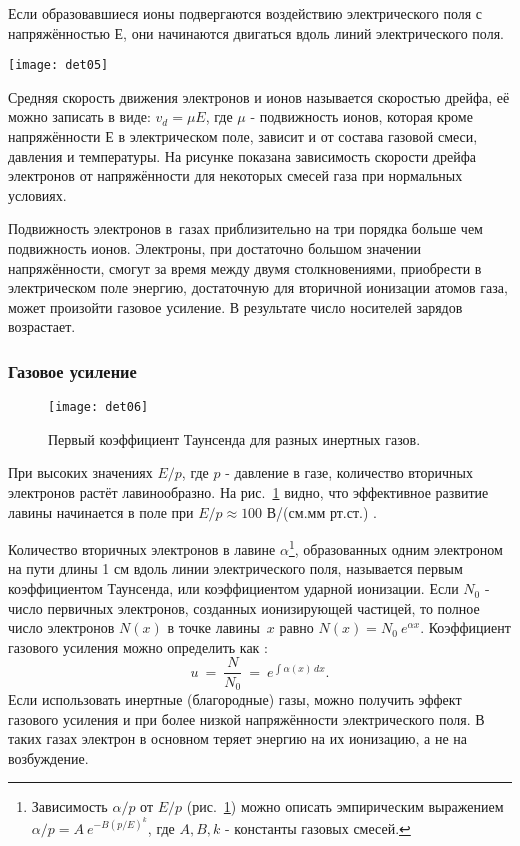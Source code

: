 Если образовавшиеся ионы подвергаются воздействию электрического поля
с напряжённостью $Е$, они начинаются двигаться вдоль линий электрического
поля.
\begin{floatingfigure}[l]{7.0cm}
  \hspace{-0.7cm}
  \texttt{[image: det05]}
\end{floatingfigure}
\noindent
Средняя скорость движения электронов и ионов называется скоростью дрейфа,
её можно записать в виде: $v_d =\mu E$, где $\mu$ - подвижность ионов,
которая кроме напряжённости $Е$ в электрическом поле, зависит и от состава
газовой смеси, давления и температуры. На рисунке показана зависимость
скорости дрейфа электронов от напряжённости для некоторых смесей газа при
нормальных условиях.

Подвижность электронов в~газах приблизительно на три порядка больше чем
подвижность ионов.
Электроны, при достаточно большом значении напряжённости, смогут за
время между двумя столкновениями, приобрести в электрическом поле
энергию, достаточную для вторичной ионизации атомов газа, может произойти
газовое усиление. В результате число носителей зарядов возрастает.

\subsubsection{Газовое усиление}
\begin{figure}[]\center
  \texttt{[image: det06]}
  \caption{Первый коэффициент Таунсенда для разных инертных газов.}
  \label{fig:det06}
\end{figure}

При высоких значениях $E/p$, где $p$ - давление в газе, количество
вторичных электронов растёт лавинообразно. На рис.~\ref{fig:det06} видно,
что эффективное развитие лавины начинается в поле при $E/p \approx 100$
В/(см.мм рт.ст.) \cite{rop:04}.

Количество вторичных электронов в лавине $\alpha$\footnote{Зависимость
  $\alpha/p$ от $E/p$ (рис.~\ref{fig:det06}) можно описать эмпирическим
  выражением $\alpha/p = A~e^{-B(p/E)^k}$, где $A, B, k$ - константы газовых
  смесей.}, образованных одним электроном
на пути длины 1 см вдоль линии электрического поля,
называется первым коэффициентом Таунсенда, или коэффициентом ударной
ионизации. Если $N_0$ - число первичных электронов, созданных
ионизирующей
частицей, то полное число электронов $N(x)$ %
в точке лавины~$x$ равно $N(x) = N_0~e^{\alpha x}$. Коэффициент газового
усиления можно определить как \cite{sau:02}:
\[
u~=~\frac{N}{N_0}~=~e^ {\int \alpha(x) \,dx}.
\]
Если использовать инертные (благородные) газы, можно получить эффект
газового усиления и при более низкой напряжённости электрического поля.
В таких газах электрон в основном теряет энергию на их ионизацию, а не на
возбуждение.

